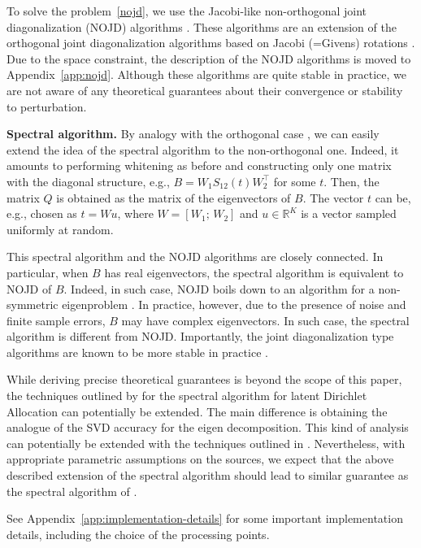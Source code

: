 \documentclass{article}
\newcommand{\ppp}{\textbf}
\newcommand{\R}{\mathbb{R}}
\begin{document}
To solve the problem~\eqref{nojd}, we use the Jacobi-like non-orthogonal joint diagonalization (NOJD) algorithms  \citep[e.g.,][]{FuGao2006,IfeEtAl2009,LucAlb2010}. 
These algorithms are an extension of the orthogonal joint diagonalization algorithms based on Jacobi (=Givens) rotations \citep{GolVan1996,BunEtAl1993,CarSou1996}.
Due to the space constraint, the description of the NOJD algorithms is moved to Appendix~\ref{app:nojd}.
Although these algorithms are quite stable in practice, we are not aware of any theoretical guarantees about their convergence or stability to perturbation.

\ppp{Spectral algorithm.} By analogy with the orthogonal case \citep{Car1989,AnaEtAl2012}, we can easily extend the idea of the spectral algorithm to the non-orthogonal one. Indeed, it amounts to performing whitening as before and constructing only one matrix with the diagonal structure, e.g., $B=W_1 S_{12}(t) W_2^{\top}$ for some $t$. Then, the matrix $Q$ is obtained as the matrix of the eigenvectors of $B$. The vector $t$ can be, e.g., chosen as $t=Wu$, where $W=[W_1; \,W_2]$ and $u\in\R^K$ is a vector sampled uniformly at random.

This spectral algorithm and the NOJD algorithms are closely connected. In particular, when $B$ has real eigenvectors, the spectral algorithm is equivalent to NOJD of $B$. Indeed, in such case, NOJD boils down to an algorithm for a non-symmetric eigenproblem \citep{Ebe1962,Ruh1968}. 
In practice, however, due to the presence of noise and finite sample errors, $B$ may have complex eigenvectors. In such case, the spectral algorithm is different from NOJD.
Importantly, the joint diagonalization type algorithms are known to be more stable in practice \citep[see, e.g.,][]{BacJor2002,PodEtAl2015}.

While deriving precise theoretical guarantees is beyond the scope of this paper, the techniques outlined by \citet{AnaEtAl2012} for the spectral algorithm for latent Dirichlet Allocation can potentially be extended. The main difference is obtaining the analogue of the SVD accuracy \citep[Lemma C.3,][]{AnaEtAl2013} for the eigen decomposition. This kind of analysis can potentially be extended with the techniques outlined in \citep[Chapter 4,][]{SteSun1990}.
Nevertheless, with appropriate parametric assumptions on the sources, we expect that the above described extension of the spectral algorithm should lead to similar guarantee as the spectral algorithm of \citet{AnaEtAl2012}.  

See Appendix~\ref{app:implementation-details} for some important implementation details, including the choice of the processing points.
\end{document}

